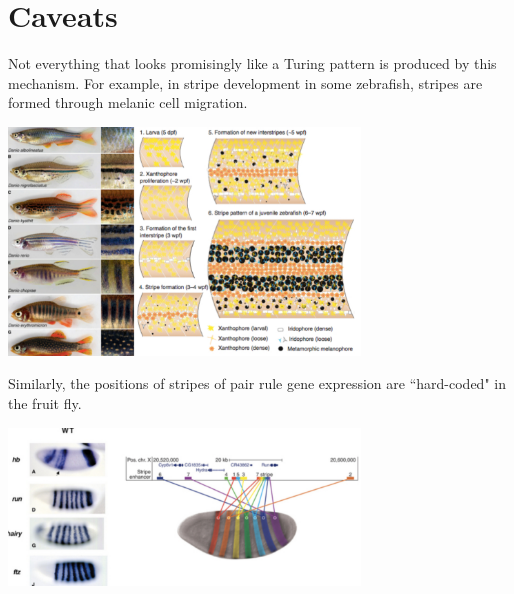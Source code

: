 \documentclass{article}
\begin{document}
\section*{Caveats}

Not everything that looks promisingly like a Turing pattern is produced by this mechanism. For example, in stripe development in some zebrafish, stripes are formed through melanic cell migration.

\begin{center}
\includegraphics[width=0.7\textwidth]{fish.pdf}
\end{center}

Similarly, the positions of stripes of pair rule gene expression are ``hard-coded" in the fruit fly.

\begin{center}
\includegraphics[width=0.7\textwidth]{pairrule.pdf}
\end{center}
\end{document}
